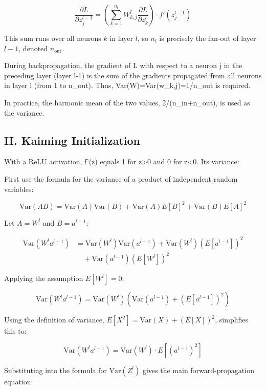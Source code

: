 \[
\frac{\partial L}{\partial z_j^{l-1}}
=\left(\sum_{k=1}^{n_l}W^l_{k,j}\frac{\partial L}{\partial z_k^l}\right)\cdot f'(z_j^{l-1})
\]

This sum runs over all neurons \(k\) in layer \(l\), so \(n_l\) is precisely the fan-out of layer \(l-1\), denoted \(n_{\mathrm{out}}\).

During backpropagation, the gradient of L with respect to a neuron j in the preceding layer (layer l-1) is the sum of the gradients propagated from all neurons in layer l (from 1 to n\_out). Thus, Var(W)=Var(w\_k,j)=1/n\_out is required.

In practice, the harmonic mean of the two values, 2/(n\_in+n\_out), is used as the variance.

\hypertarget{ii.-kaiming-initialization}{%
\subsection{II. Kaiming Initialization}\label{ii.-kaiming-initialization}}

With a ReLU activation, f'(z) equals 1 for z\textgreater0 and 0 for z\textless0. Its variance:

First use the formula for the variance of a product of independent random variables:

\[
\mathrm{Var}(AB)
=\mathrm{Var}(A)\mathrm{Var}(B)
+\mathrm{Var}(A)E[B]^2
+\mathrm{Var}(B)E[A]^2
\]

Let \(A=W^l\) and \(B=a^{l-1}\):

\[
\begin{aligned}
\mathrm{Var}(W^la^{l-1})
&=\mathrm{Var}(W^l)\mathrm{Var}(a^{l-1})
+\mathrm{Var}(W^l)(E[a^{l-1}])^2\\
&\quad+\mathrm{Var}(a^{l-1})(E[W^l])^2
\end{aligned}
\]

Applying the assumption \(E[W^l]=0\):

\[
\mathrm{Var}(W^la^{l-1})
=\mathrm{Var}(W^l)\left(\mathrm{Var}(a^{l-1})+(E[a^{l-1}])^2\right)
\]

Using the definition of variance, \(E[X^2]=\mathrm{Var}(X)+(E[X])^2\), simplifies this to:

\[
\mathrm{Var}(W^la^{l-1})
=\mathrm{Var}(W^l)\cdot E[(a^{l-1})^2]
\]

Substituting into the formula for \(\mathrm{Var}(Z^l)\) gives the main forward-propagation equation:

